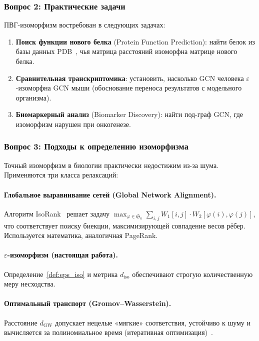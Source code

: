 \subsubsection{Вопрос 2: Практические задачи}

ПВГ-изоморфизм востребован в следующих задачах:
\begin{enumerate}
    \item \textbf{Поиск функции нового белка} (Protein Function Prediction):
          найти белок из базы данных PDB~\cite{alphafold2021},
          чья матрица расстояний изоморфна матрице нового белка.
    \item \textbf{Сравнительная транскриптомика}:
          установить, насколько GCN человека $\varepsilon$-изоморфна GCN мыши
          (обоснование переноса результатов с модельного организма).
    \item \textbf{Биомаркерный анализ} (Biomarker Discovery):
          найти под-граф GCN, где изоморфизм нарушен при онкогенезе.
\end{enumerate}

\subsubsection{Вопрос 3: Подходы к определению изоморфизма}

Точный изоморфизм в биологии практически недостижим из-за шума.
Применяются три класса релаксаций:

\paragraph{Глобальное выравнивание сетей (Global Network Alignment).}
Алгоритм IsoRank~\cite{isorank2008} решает задачу
$\max_{\varphi \in \mathfrak{S}_n} \sum_{i,j} W_1[i,j] \cdot W_2[\varphi(i),\varphi(j)]$,
что соответствует поиску биекции, максимизирующей совпадение весов рёбер.
Используется математика, аналогичная PageRank.

\paragraph{$\varepsilon$-изоморфизм (настоящая работа).}
Определение~\ref{def:eps_iso} и метрика $d_{\mathrm{iso}}$
обеспечивают строгую количественную меру несходства.

\paragraph{Оптимальный транспорт (Gromov–Wasserstein).}
Расстояние $d_{\mathrm{GW}}$ допускает нецелые «мягкие» соответствия,
устойчиво к шуму и вычисляется за полиномиальное время
(итеративная оптимизация)~\cite{gromov_wasserstein}.

